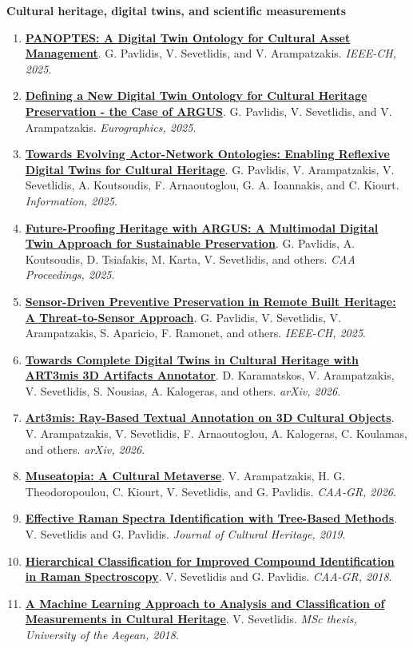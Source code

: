 \documentclass[11pt,a4paper]{article}
\newcommand{\paper}[4]{%
  \item \textbf{\href{#4}{#1}}. #2. \textit{#3}.
}
\begin{document}
\textbf{Cultural heritage, digital twins, and scientific measurements}
\begin{enumerate}
  \paper{PANOPTES: A Digital Twin Ontology for Cultural Asset Management}{G. Pavlidis, V. Sevetlidis, and V. Arampatzakis}{IEEE-CH, 2025}{https://doi.org/10.5281/zenodo.16633603}
  \paper{Defining a New Digital Twin Ontology for Cultural Heritage Preservation - the Case of ARGUS}{G. Pavlidis, V. Sevetlidis, and V. Arampatzakis}{Eurographics, 2025}{https://zenodo.org/records/17276771}
  \paper{Towards Evolving Actor-Network Ontologies: Enabling Reflexive Digital Twins for Cultural Heritage}{G. Pavlidis, V. Arampatzakis, V. Sevetlidis, A. Koutsoudis, F. Arnaoutoglou, G. A. Ioannakis, and C. Kiourt}{Information, 2025}{https://doi.org/10.3390/info16100892}
  \paper{Future-Proofing Heritage with ARGUS: A Multimodal Digital Twin Approach for Sustainable Preservation}{G. Pavlidis, A. Koutsoudis, D. Tsiafakis, M. Karta, V. Sevetlidis, and others}{CAA Proceedings, 2025}{https://doi.org/10.5281/zenodo.17755550}
  \paper{Sensor-Driven Preventive Preservation in Remote Built Heritage: A Threat-to-Sensor Approach}{G. Pavlidis, V. Sevetlidis, V. Arampatzakis, S. Aparicio, F. Ramonet, and others}{IEEE-CH, 2025}{https://ieeexplore.ieee.org/abstract/document/11279543}
  \paper{Towards Complete Digital Twins in Cultural Heritage with ART3mis 3D Artifacts Annotator}{D. Karamatskos, V. Arampatzakis, V. Sevetlidis, S. Nousias, A. Kalogeras, and others}{arXiv, 2026}{https://arxiv.org/abs/2602.12761}
  \paper{Art3mis: Ray-Based Textual Annotation on 3D Cultural Objects}{V. Arampatzakis, V. Sevetlidis, F. Arnaoutoglou, A. Kalogeras, C. Koulamas, and others}{arXiv, 2026}{https://arxiv.org/abs/2602.12725}
  \paper{Museatopia: A Cultural Metaverse}{V. Arampatzakis, H. G. Theodoropoulou, C. Kiourt, V. Sevetlidis, and G. Pavlidis}{CAA-GR, 2026}{https://doi.org/10.1007/978-3-032-06389-2_18}
  \paper{Effective Raman Spectra Identification with Tree-Based Methods}{V. Sevetlidis and G. Pavlidis}{Journal of Cultural Heritage, 2019}{https://doi.org/10.1016/j.culher.2018.10.016}
  \paper{Hierarchical Classification for Improved Compound Identification in Raman Spectroscopy}{V. Sevetlidis and G. Pavlidis}{CAA-GR, 2018}{https://sites.caa-international.org/gr/wp-content/uploads/sites/26/2019/04/CAA-GR-2018-proceedings.pdf}
  \paper{A Machine Learning Approach to Analysis and Classification of Measurements in Cultural Heritage}{V. Sevetlidis}{MSc thesis, University of the Aegean, 2018}{https://www.openarchives.gr/aggregator-openarchives/edm/hellanicus/000100-11610_19962?language=en}

\end{enumerate}
\end{document}
